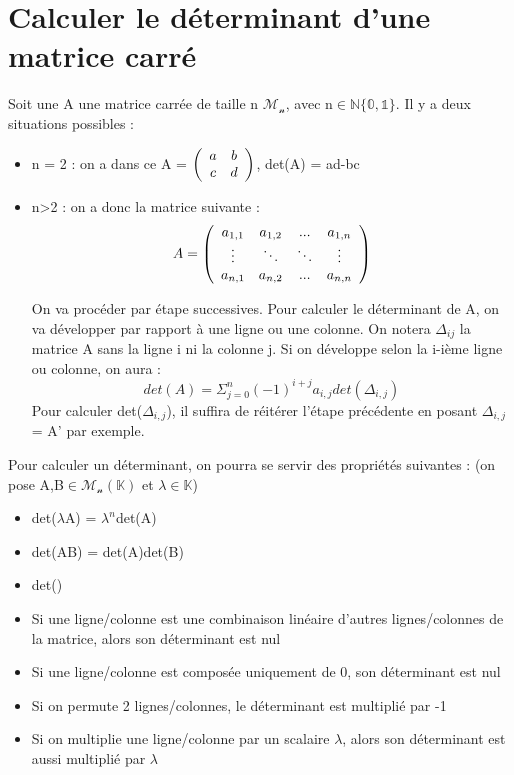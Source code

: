 \documentclass{article}
\begin{document}
\section{Calculer le déterminant d'une matrice carré}
Soit une A une matrice carrée de taille n $\mathcal{M_{n}}$, avec n$\in\mathbb{N\{0,1\}}$. Il y a deux situations possibles :
\begin{itemize}
  \item n = 2 : on a dans ce A = $\left(
  \begin{array}{c c}
    a & b \\
    c & d
  \end{array}
  \right)
  $, det(A) = ad-bc

  \item n>2 : on a donc la matrice suivante :
  \[
    A = \left(
      \begin{array}{c c c c}
        a_{1,1} & a_{1,2} & ... & a_{1,n} \\
        \vdots & \ddots & \ddots & \vdots \\
        a_{n,1} & a_{n,2} & ... & a_{n,n}
      \end{array}
    \right)  
  \]

  On va procéder par étape successives. Pour calculer le déterminant de A, on va développer par rapport à une ligne ou une colonne. On notera $\Delta_{ij}$ la matrice A sans la ligne i ni la colonne j. Si on développe selon la i-ième ligne ou colonne, on aura :
  \[ det(A) = \Sigma_{j=0}^{n} (-1)^{i+j} a_{i,j} det(\Delta_{i,j}) \]
  Pour calculer det($\Delta_{i,j}$), il suffira de réitérer l'étape précédente en posant $\Delta_{i,j}$ = A' par exemple.
\end{itemize}
\noindent Pour calculer un déterminant, on pourra se servir des propriétés suivantes : (on pose A,B$\in\mathcal{M_{n}}(\mathbb{K})$ et $\lambda\in\mathbb{K}$)
\begin{itemize}
  \item det($\lambda$A) = $\lambda^{n}$det(A)
  \item det(AB) = det(A)det(B)
  \item det()
  \item Si une ligne/colonne est une combinaison linéaire d'autres lignes/colonnes de la matrice, alors son déterminant est nul
  \item Si une ligne/colonne est composée uniquement de 0, son déterminant est nul
  \item Si on permute 2 lignes/colonnes, le déterminant est multiplié par -1
  \item Si on multiplie une ligne/colonne par un scalaire $\lambda$, alors son déterminant est aussi multiplié par $\lambda$
\end{itemize}
\end{document}
